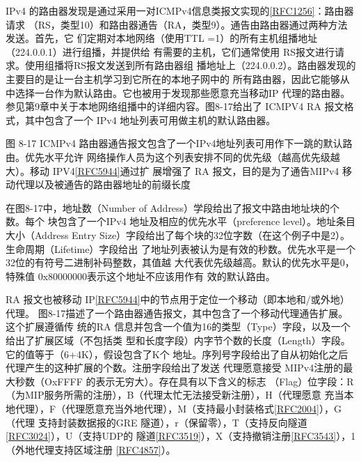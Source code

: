IPv4
的路由器发现是通过采用一对ICMPv4信息类报文实现的\href{https://www.rfc-editor.org/rfc/rfc1256}{[RFC1256]}：路由器请求
（RS，类型10）和路由器通告（RA，类型9）。通告由路由器通过两种方法发送。首先，它
们定期对本地网络（使用TTL =1）的所有主机组播地址（224.0.0.1）进行组播，并提供给
有需要的主机，它们通常使用 RS报文进行请求。使用组播将RS报文发送到所有路由器组
播地址上（224.0.0.2）。路由器发现的主要目的是让一台主机学习到它所在的本地子网中的
所有路由器，因此它能够从中选择一台作为默认路由。它也被用于发现那些愿意充当移动IP
代理的路由器。参见第9章中关于本地网络组播中的详细内容。图8-17给出了 ICMPV4 RA
报文格式，其中包含了一个 IPv4 地址列表可用做主机的默认路由器。

图 8-17 ICMPv4 路由器通告报文包含了一个IPv4地址列表可用作下一跳的默认路由。优先水平允许
网络操作人员为这个列表安排不同的优先级（越高优先级越大）。移动
IPV4\href{https://www.rfc-editor.org/rfc/rfc5944}{[RFC5944]}通过扩
展增强了 RA 报文，目的是为了通告MIPv4 移动代理以及被通告的路由器地址的前缀长度

在图8-17中，地址数（Number of Address）学段给出了报文中路由地址块的个数。每个
块包含了一个IPv4 地址及相应的优先水平（preference level）。地址条目大小（Address Entry
Size）字段给出了每个块的32位字数（在这个例子中是2）。生命周期（Lifetime）字段给出
了地址列表被认为是有效的秒数。优先水平是一个32位的有符号二进制补码整数，其值越
大代表优先级越高。默认的优先水平是0，特殊值 0x80000000表示这个地址不应该用作有
效的默认路由。

RA 报文也被移动
IP\href{https://www.rfc-editor.org/rfc/rfc5944}{[RFC5944]}中的节点用于定位一个移动（即本地和/或外地）代理。
图8-17描述了一个路由器通告报文，其中包含了一个移动代理通告扩展。这个扩展遵循传
统的RA 信息并包含一个值为16的类型（Type）字段，以及一个给出了扩展区域（不包括类
型和长度字段）内字节个数的长度（Length）字段。它的值等于（6+4K），假设包含了K个
地址。序列号字段给出了自从初始化之后代理产生的这种扩展的个数。注册字段给出了发送
代理愿意接受 MIPv4注册的最大秒数（OxFFFF 的表示无穷大）。存在具有以下含义的标志
（Flag）位字段：R（为MIP服务所需的注册），B（代理太忙无法接受新注册），H（代理愿意
充当本地代理），F（代理愿意充当外地代理），M（支持最小封装格式\href{https://www.rfc-editor.org/rfc/rfc2004}{[RFC2004]}），G（代理
支持封装数据报的GRE
隧道），r（保留零），T（支持反向隧道\href{https://www.rfc-editor.org/rfc/rfc3024}{[RFC3024]}），U（支持UDP的
隧道\href{https://www.rfc-editor.org/rfc/rfc3519}{[RFC3519]}），X（支持撤销注册\href{https://www.rfc-editor.org/rfc/rfc3543}{[RFC3543]}），1（外地代理支持区域注册
\href{https://www.rfc-editor.org/rfc/rfc4857}{[RFC4857]}）。

